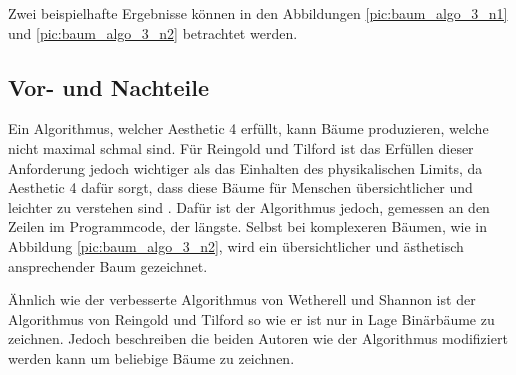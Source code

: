 Zwei beispielhafte Ergebnisse können in den Abbildungen \ref{pic:baum_algo_3_n1} 
und \ref{pic:baum_algo_3_n2} betrachtet werden. 


\subsection{Vor- und Nachteile}

Ein Algorithmus, welcher Aesthetic 4 erfüllt, kann Bäume produzieren, welche nicht maximal schmal sind. 
Für Reingold und Tilford ist das Erfüllen dieser Anforderung jedoch wichtiger als das Einhalten des physikalischen Limits, 
da Aesthetic 4 dafür sorgt, dass diese Bäume für Menschen übersichtlicher und leichter zu verstehen sind \cite[S. 224]{q2}. Dafür ist der Algorithmus 
jedoch, gemessen an den Zeilen im Programmcode, der längste. Selbst bei komplexeren Bäumen, wie in Abbildung \ref{pic:baum_algo_3_n2},
wird ein übersichtlicher und ästhetisch ansprechender Baum gezeichnet. 

Ähnlich wie der verbesserte Algorithmus von Wetherell und Shannon ist der Algorithmus von Reingold und Tilford so wie er ist nur in Lage
Binärbäume zu zeichnen. Jedoch beschreiben die beiden Autoren wie der Algorithmus modifiziert werden kann um beliebige Bäume zu zeichnen.

